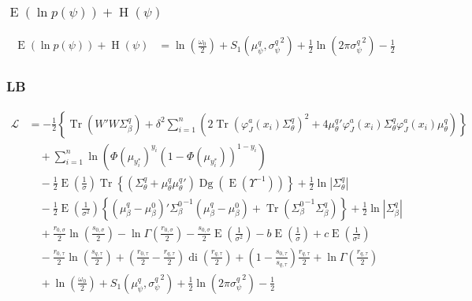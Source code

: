 \documentclass[11pt]{article}
\DeclareMathOperator{\Tr}{Tr}
\newcommand{\opn}{\operatorname}
\begin{document}
\subsubsection{$\opn{E}\left(\ln p\left(\psi\right)\right) + \opn{H}\left(\psi\right)$}
\begin{align*}
  \opn{E}\left(\ln p\left(\psi\right)\right) + \opn{H}\left(\psi\right) &= \ln \left(\frac{\omega_{0}}{2}\right) + S_{1}\left(\mu_{\psi}^{q}, {\sigma_{\psi}^{q}}^{2}\right) + \frac{1}{2}\ln \left(2\pi {\sigma_{\psi}^{q}}^{2}\right) -\frac{1}{2}
\end{align*}
\subsubsection{LB}
  \begin{align*}
    \mathcal{L} &= -\frac{1}{2}\left\{\Tr\left(W'W\Sigma_{\beta}^{q}\right) + \delta^{2}\sum_{i=1}^{n}\left(2\Tr\left(\varphi_{J}^{a}\left(x_{i}\right)\Sigma_{\theta}^{q}\right)^{2} +4{\mu_{\theta}^{q}}'\varphi_{J}^{a}\left(x_{i}\right)\Sigma_{\theta}^{q}\varphi_{J}^{a}\left(x_{i}\right)\mu_{\theta}^{q}\right) \right\}\\
    &\quad + \sum_{i=1}^{n}\ln\left(\Phi\left(\mu_{y_{i}^{*}}\right)^{y_{i}}\left(1-\Phi\left(\mu_{y_{i}^{*}}\right)\right)^{1-y_{i}}\right)\\
    &\quad -\frac{1}{2}\opn{E}\left(\frac{1}{\sigma}\right)\Tr\left\{\left(\Sigma_{\theta}^{q}+\mu_{\theta}^{q}{\mu_{\theta}^{q}}'\right)\opn{Dg}\left(\opn{E}\left(\Upsilon^{-1}\right)\right) \right\} +\frac{1}{2}\ln\left|\Sigma_{\theta}^{q}\right|\\
    &\quad -\frac{1}{2}\opn{E}\left(\frac{1}{\sigma^{2}}\right)\left\{\left(\mu_{\beta}^{q}-\mu_{\beta}^{0}\right)'{\Sigma_{\beta}^{0}}^{-1}\left(\mu_{\beta}^{q}-\mu_{\beta}^{0}\right) + \Tr\left({\Sigma_{\beta}^{0}}^{-1}\Sigma_{\beta}^{q}\right) \right\} + \frac{1}{2}\ln\left|\Sigma_{\beta}^{q}\right|\\
    &\quad +\frac{r_{0,\sigma}}{2}\ln\left(\frac{s_{0,\sigma}}{2}\right)-\ln\Gamma\left(\frac{r_{0,\sigma}}{2}\right) -\frac{s_{0,\sigma}}{2}\opn{E}\left(\frac{1}{\sigma^{2}}\right) -b\opn{E}\left(\frac{1}{\sigma}\right) +c\opn{E}\left(\frac{1}{\sigma^{2}}\right)\\
    &\quad -\frac{r_{0,\tau}}{2}\ln\left(\frac{s_{q,\tau}}{2}\right) +\left(\frac{r_{0,\tau}}{2} -\frac{r_{q,\tau}}{2}\right)\opn{di}\left(\frac{r_{q,\tau}}{2}\right) +\left(1-\frac{s_{0,\tau}}{s_{q,\tau}}\right)\frac{r_{q,\tau}}{2} +\ln\Gamma\left(\frac{r_{q,\tau}}{2}\right)\\
    &\quad +\ln\left(\frac{\omega_{0}}{2}\right) + S_{1}\left(\mu_{\psi}^{q}, {\sigma_{\psi}^{q}}^{2}\right) + \frac{1}{2}\ln\left(2\pi {\sigma_{\psi}^{q}}^{2}\right) -\frac{1}{2}
  \end{align*}
\end{document}
